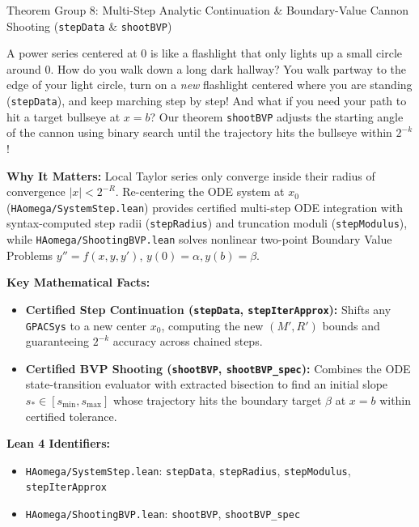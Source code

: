 \documentclass[11pt,a4paper]{article}
\newcommand{\lean}[1]{\texttt{\nolinkurl{#1}}}
\begin{document}
\vspace{6pt}

\begin{thmcard}{Theorem Group 8: Multi-Step Analytic Continuation \& Boundary-Value Cannon Shooting (\lean{stepData} \& \lean{shootBVP})}
\begin{eli5box}
A power series centered at $0$ is like a flashlight that only lights up a small circle around $0$. How do you walk down a long dark hallway? You walk partway to the edge of your light circle, turn on a \emph{new} flashlight centered where you are standing (\lean{stepData}), and keep marching step by step! And what if you need your path to hit a target bullseye at $x = b$? Our theorem \lean{shootBVP} adjusts the starting angle of the cannon using binary search until the trajectory hits the bullseye within $2^{-k}$!
\end{eli5box}

\textbf{Why It Matters:}
Local Taylor series only converge inside their radius of convergence $|x| < 2^{-R}$. Re-centering the ODE system at $x_0$ (\lean{HAomega/SystemStep.lean}) provides certified multi-step ODE integration with syntax-computed step radii (\lean{stepRadius}) and truncation moduli (\lean{stepModulus}), while \lean{HAomega/ShootingBVP.lean} solves nonlinear two-point Boundary Value Problems $y'' = f(x, y, y')$, $y(0)=\alpha, y(b)=\beta$.

\textbf{Key Mathematical Facts:}
\begin{itemize}
  \item \textbf{Certified Step Continuation (\lean{stepData}, \lean{stepIterApprox}):} Shifts any \lean{GPACSys} to a new center $x_0$, computing the new $(M', R')$ bounds and guaranteeing $2^{-k}$ accuracy across chained steps.
  \item \textbf{Certified BVP Shooting (\lean{shootBVP}, \lean{shootBVP_spec}):} Combines the ODE state-transition evaluator with extracted bisection to find an initial slope $s_* \in [s_{\min}, s_{\max}]$ whose trajectory hits the boundary target $\beta$ at $x = b$ within certified tolerance.
\end{itemize}

\textbf{Lean 4 Identifiers:}
\begin{itemize}
  \item \lean{HAomega/SystemStep.lean}: \lean{stepData}, \lean{stepRadius}, \lean{stepModulus}, \lean{stepIterApprox}
  \item \lean{HAomega/ShootingBVP.lean}: \lean{shootBVP}, \lean{shootBVP_spec}
\end{itemize}
\end{thmcard}
\end{document}
